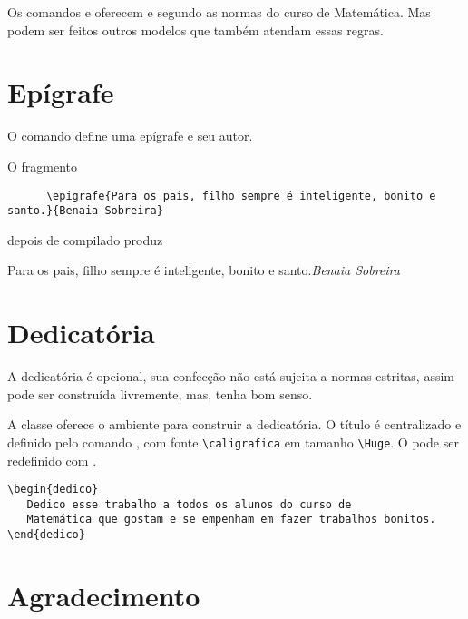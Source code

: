 Os comandos  e  oferecem  e  segundo as normas do curso de Matemática. Mas podem ser feitos outros modelos que também atendam essas regras.

\section{Epígrafe}

O comando  define uma epígrafe e seu autor.
\begin{tcolorbox}
O fragmento
   \begin{lstlisting}
      \epigrafe{Para os pais, filho sempre é inteligente, bonito e santo.}{Benaia Sobreira}
   \end{lstlisting}
\tcblower
depois de compilado produz
   \begin{flushright}
 	  {\footnotesize Para os pais, filho sempre é inteligente, bonito e santo.\hspace{0.6cm}\emph{Benaia Sobreira}}
   \end{flushright}
\end{tcolorbox}

\section{Dedicatória}

A dedicatória é opcional, sua confecção não está sujeita a normas
estritas, assim pode ser construída livremente, mas, tenha bom senso.

A classe \estilo{} oferece o ambiente  para
construir a dedicatória. O título é centralizado e definido
pelo comando , com fonte \verb|\caligrafica| em
tamanho \verb|\Huge|. O  pode ser redefinido com
.
\begin{tcolorbox}
\begin{lstlisting}
\begin{dedico}
   Dedico esse trabalho a todos os alunos do curso de
   Matemática que gostam e se empenham em fazer trabalhos bonitos.
\end{dedico}
\end{lstlisting}
\end{tcolorbox}

\section{Agradecimento}

